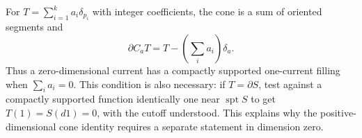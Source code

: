 \begin{example}\label{ex:zero-current-augmentation}
For $T=\sum_{i=1}^k a_i\delta_{p_i}$ with integer coefficients, the cone is a sum of oriented segments and
\[
 \partial C_aT=T-\left(\sum_i a_i\right)\delta_a.
\]
Thus a zero-dimensional current has a compactly supported one-current filling when $\sum_i a_i=0$. This condition is also necessary: if $T=\partial S$, test against a compactly supported function identically one near $\operatorname{spt}S$ to get $T(1)=S(d1)=0$, with the cutoff understood. This explains why the positive-dimensional cone identity requires a separate statement in dimension zero.
\end{example}
